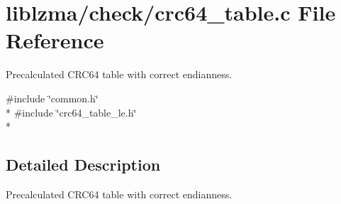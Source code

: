 \section{liblzma/check/crc64\-\_\-table.c File Reference}
\label{crc64__table_8c}


Precalculated C\-R\-C64 table with correct endianness.  


{\ttfamily \#include \char`\"{}common.\-h\char`\"{}}\\*
{\ttfamily \#include \char`\"{}crc64\-\_\-table\-\_\-le.\-h\char`\"{}}\\*


\subsection{Detailed Description}
Precalculated C\-R\-C64 table with correct endianness. 